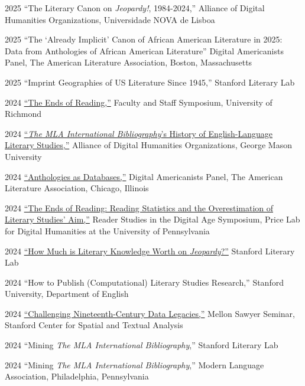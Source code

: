 \documentclass[12pt,letterpaper]{report}
\begin{document}
\begin{tablist}
	\item[2025] \tab{}\enquote{The Literary Canon on \emph{Jeopardy!}, 1984-2024,} Alliance of Digital Humanities Organizations, Universidade NOVA de Lisboa
	\item[2025] \tab{}\enquote{The \enquote{Already Implicit} Canon of African American Literature in 2025: Data from Anthologies of African American Literature} Digital Americanists Panel, The American Literature Association, Boston, Massachusetts
	\item[2025] \tab{}\enquote{Imprint Geographies of US Literature Since 1945,} Stanford Literary Lab
	\item[2024] \tab{}\href{https://fredner.org/reading}{\enquote{The Ends of Reading,}} Faculty and Staff Symposium, University of Richmond
	\item[2024] \tab{}\href{https://docs.google.com/presentation/d/1l9RF4TAfG1vhc70sQD6SnQdnvPGKdysiGc0saopwz_U/edit?usp=sharing}{\enquote{\emph{The MLA International Bibliography}'s History of English-Language Literary Studies,}} Alliance of Digital Humanities Organizations, George Mason University
	\item[2024] \tab{}\href{https://docs.google.com/presentation/d/1kxUCWK4iz4En_G63ZDqExkxh6nzd3Qp0PB6DmuwebyU/edit?usp=sharing}{\enquote{Anthologies as Databases,}} Digital Americanists Panel, The American Literature Association, Chicago, Illinois
	\item[2024] \tab{}\href{https://fredner.org/price/}{\enquote{The Ends of Reading: Reading Statistics and the Overestimation of Literary Studies' Aim,}} Reader Studies in the Digital Age Symposium, Price Lab for Digital Humanities at the University of Pennsylvania
	\item[2024] \tab{}\href{https://docs.google.com/presentation/d/1EKy3ISqJIJrCxeOp9XZF2KULLyvgqQUtn-MRDFojC54/edit?usp=sharing}{\enquote{How Much is Literary Knowledge Worth on \emph{Jeopardy}?}} Stanford Literary Lab
	\item[2024] \tab{}\enquote{How to Publish (Computational) Literary Studies Research,} Stanford University, Department of English
	\item[2024] \tab{}\href{https://fredner.org/sawyer/}{\enquote{Challenging Nineteenth-Century Data Legacies,}} Mellon Sawyer Seminar, Stanford Center for Spatial and Textual Analysis
	\item[2024] \tab{}\enquote{Mining \emph{The MLA International Bibliography},} Stanford Literary Lab
	\item[2024] \tab{}\enquote{Mining \emph{The MLA International Bibliography},} Modern Language Association, Philadelphia, Pennsylvania

\end{tablist}
\end{document}
